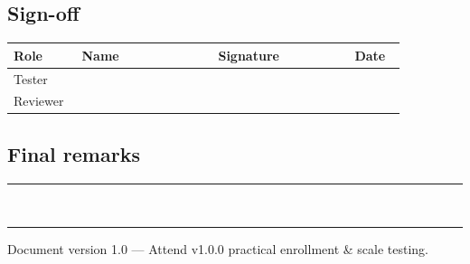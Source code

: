 \documentclass[11pt,a4paper,oneside]{article}
\newcommand{\fillinlong}{\rule{0.72\textwidth}{0.4pt}}
\begin{document}
\subsection{Sign-off}

\small
\begin{tabular}{@{}>{\raggedright\arraybackslash}p{0.16\linewidth} >{\raggedright\arraybackslash}p{0.32\linewidth} >{\raggedright\arraybackslash}p{0.32\linewidth} >{\raggedright\arraybackslash}p{0.12\linewidth}@{}}
  \toprule
  \textbf{Role} & \textbf{Name} & \textbf{Signature} & \textbf{Date} \\
  \midrule
  Tester   & & & \\
  Reviewer & & & \\
  \bottomrule
\end{tabular}
\normalsize

\subsection{Final remarks}

\fillinlong\\[0.5cm]
\fillinlong

\vfill
\begin{center}
  \small\color{AttendGray}
  Document version 1.0 — Attend v1.0.0 practical enrollment \& scale testing.
\end{center}
\end{document}

